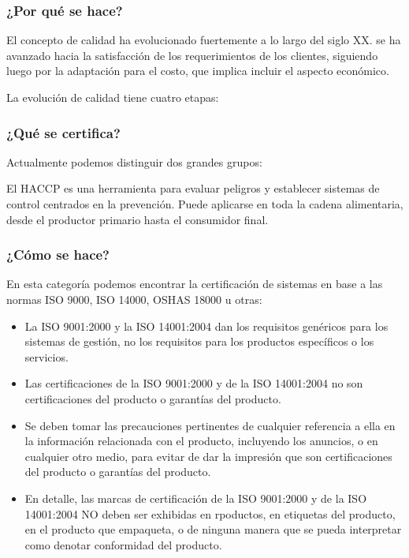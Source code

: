 \subsubsection{¿Por qué se hace?}

El concepto de calidad ha evolucionado fuertemente a lo largo del siglo XX. se ha avanzado hacia la satisfacción de los requerimientos de los clientes, siguiendo luego por la adaptación para el costo, que implica incluir el aspecto económico.

La evolución de calidad tiene cuatro etapas:

\subsubsection{¿Qué se certifica?}
Actualmente podemos distinguir dos grandes grupos:

El HACCP es una herramienta para evaluar peligros y establecer sistemas de control centrados en la prevención. Puede aplicarse en toda la cadena alimentaria, desde el productor primario hasta el consumidor final.

\subsubsection{¿Cómo se hace?}

En esta categoría podemos encontrar la certificación de sistemas en base a las normas ISO 9000, ISO 14000, OSHAS 18000 u otras:
\begin{itemize}
    \item La ISO 9001:2000 y la ISO 14001:2004 dan los requisitos genéricos para los sistemas de gestión, no los requisitos para los productos específicos o los servicios.
    \item Las certificaciones de la ISO 9001:2000 y de la ISO 14001:2004 no son certificaciones del producto o garantías del producto.
    \item Se deben tomar las precauciones pertinentes de cualquier referencia a ella en la información relacionada con el producto, incluyendo los anuncios, o en cualquier otro medio, para evitar de dar la impresión que son certificaciones del producto o garantías del producto.
    \item En detalle, las marcas de certificación de la ISO 9001:2000 y de la ISO 14001:2004 NO deben ser exhibidas en rpoductos, en etiquetas del producto, en el producto que empaqueta, o de ninguna manera que se pueda interpretar como denotar conformidad del producto.
\end{itemize}


